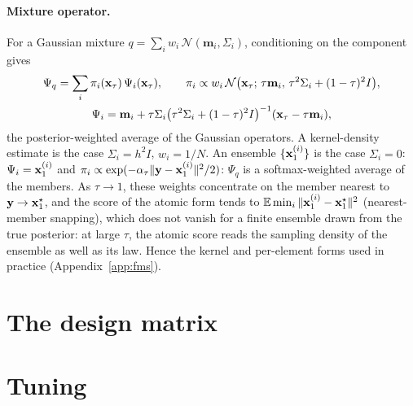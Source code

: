 \paragraph{Mixture operator.}
For a Gaussian mixture $q = \sum_i w_i\, \mathcal{N}(\mathbf{m}_i, \Sigma_i)$, conditioning on the component gives
\begin{equation}\label{eq:psi_mix}
\begin{gathered}
  \Psi_q = \sum_i \pi_i(\mathbf{x}_\tau)\, \Psi_i(\mathbf{x}_\tau), \qquad
  \pi_i \propto w_i\, \mathcal{N}\big(\mathbf{x}_\tau;\, \tau \mathbf{m}_i,\, \tau^2 \Sigma_i + (1-\tau)^2 I\big),\\
  \Psi_i = \mathbf{m}_i + \tau \Sigma_i \big(\tau^2 \Sigma_i + (1-\tau)^2 I\big)^{-1}(\mathbf{x}_\tau - \tau \mathbf{m}_i),
\end{gathered}
\end{equation}
the posterior-weighted average of the Gaussian operators. A kernel-density estimate is the case
$\Sigma_i = h^2 I$, $w_i = 1/N$. An ensemble $\{\mathbf{x}_1^{(i)}\}$ is the case $\Sigma_i = 0$: $\Psi_i = \mathbf{x}_1^{(i)}$ and
$\pi_i \propto \exp(-\alpha_\tau \|\mathbf{y} - \mathbf{x}_1^{(i)}\|^2/2)$: $\Psi_q$ is a softmax-weighted average of the members. As $\tau \to 1$, these
weights concentrate on the member nearest to $\mathbf{y} \to \mathbf{x}_1^\star$, and the score of the atomic form tends to
$\mathbb{E}\min_i \|\mathbf{x}_1^{(i)} - \mathbf{x}_1^\star\|^2$ (nearest-member snapping), which does not vanish for a finite ensemble
drawn from the true posterior: at large $\tau$, the atomic score reads the sampling density of the ensemble as well
as its law. Hence the kernel and per-element forms used in practice (Appendix~\ref{app:fms}).

\section{The design matrix}\label{app:matrix}

\section{Tuning}\label{app:tuning}

